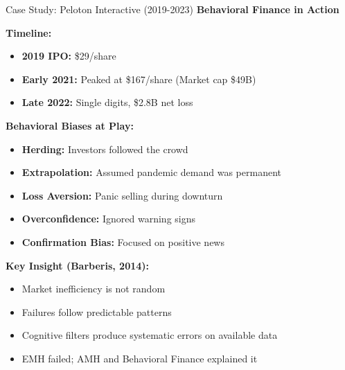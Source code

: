 \documentclass[aspectratio=169,10pt]{beamer}
\renewcommand{\small}{\fontsize{7pt}{8.5pt}\selectfont}
\renewcommand{\large}{\fontsize{9pt}{11pt}\selectfont}
\newcommand{\question}[1]{{\large\bfseries\color{crimson}#1}}
\begin{document}
	\begin{frame}{Case Study: Peloton Interactive (2019-2023)}
		\question{Behavioral Finance in Action}
		\small
		
		\textbf{Timeline:}
		\begin{itemize}
			\item \textbf{2019 IPO:} \$29/share
			\item \textbf{Early 2021:} Peaked at \$167/share (Market cap \$49B)
			\item \textbf{Late 2022:} Single digits, \$2.8B net loss
		\end{itemize}
		
		\vspace{0.1cm}
		\textbf{Behavioral Biases at Play:}
		\begin{itemize}
			\item \textbf{Herding:} Investors followed the crowd
			\item \textbf{Extrapolation:} Assumed pandemic demand was permanent
			\item \textbf{Loss Aversion:} Panic selling during downturn
			\item \textbf{Overconfidence:} Ignored warning signs
			\item \textbf{Confirmation Bias:} Focused on positive news
		\end{itemize}
		
		\vspace{0.1cm}
		\textbf{Key Insight (Barberis, 2014):}
		\begin{itemize}
			\item Market inefficiency is not random
			\item Failures follow predictable patterns
			\item Cognitive filters produce systematic errors on available data
			\item EMH failed; AMH and Behavioral Finance explained it
		\end{itemize}
	\end{frame}
	
	
\end{document}

